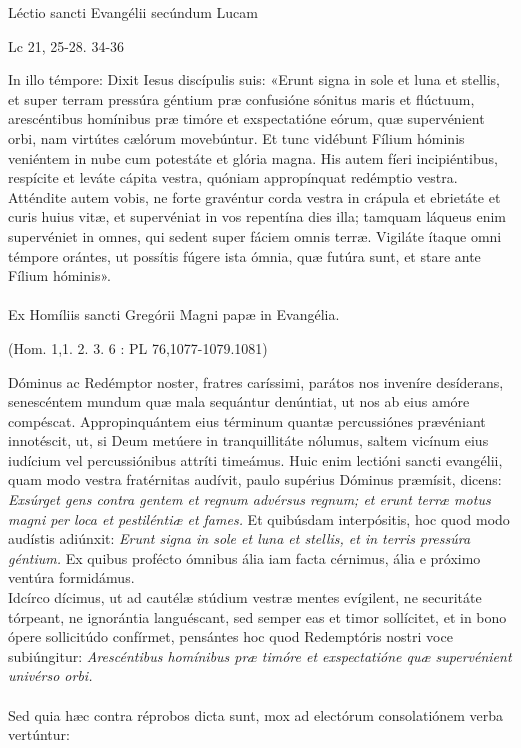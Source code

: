 \documentclass[options]{article}
\begin{document}
Léctio sancti Evangélii secúndum Lucam 
\begin{flushright}
Lc 21, 25-28. 34-36	
\end{flushright}
	In illo témpore: Dixit Iesus discípulis suis:
	«Erunt signa in sole et luna et stellis, et super terram pressúra géntium præ confusióne sónitus maris et flúctuum, arescéntibus homínibus præ timóre et exspectatióne eórum, quæ supervénient orbi, nam virtútes cælórum movebúntur.
	Et tunc vidébunt Fílium hóminis veniéntem in nube cum potestáte et glória magna. His autem fíeri incipiéntibus, respícite et leváte cápita vestra, quóniam appropínquat redémptio vestra.
	Atténdite autem vobis, ne forte gravéntur corda vestra in crápula et ebrietáte et curis huius vitæ, et supervéniat in vos repentína dies illa; tamquam láqueus enim supervéniet in omnes, qui sedent super fáciem omnis terræ. Vigiláte ítaque omni témpore orántes, ut possítis fúgere ista ómnia, quæ futúra sunt, et stare ante Fílium hóminis».\\
	\\
	Ex Homíliis sancti Gregórii Magni papæ in Evangélia.
	\begin{flushright}
			(Hom. 1,1. 2. 3. 6 : PL 76,1077-1079.1081)
	\end{flushright}
	Dóminus ac Redémptor noster, fratres caríssimi, parátos nos inveníre desíderans, senescéntem mundum quæ mala sequántur denúntiat, ut nos ab eius amóre compéscat. Appropinquántem eius términum quantæ percussiónes prævéniant innotéscit, ut, si Deum metúere in tranquillitáte nólumus, saltem vicínum eius iudícium vel percussiónibus attríti timeámus. Huic enim lectióni sancti evangélii, quam modo vestra fratérnitas audívit, paulo supérius Dóminus præmísit, dicens: \emph{Exsúrget gens contra gentem et regnum advérsus regnum; et erunt terræ motus magni per loca et pestiléntiæ et fames.} Et quibúsdam interpósitis, hoc quod modo audístis adiúnxit: \emph{Erunt signa in sole et luna et stellis, et in terris pressúra géntium.} Ex quibus profécto ómnibus ália iam facta cérnimus, ália e próximo ventúra formidámus.\\
	Idcírco dícimus, ut ad cautélæ stúdium vestræ mentes evígilent, ne securitáte tórpeant, ne ignorántia languéscant, sed semper eas et timor sollícitet, et in bono ópere sollicitúdo confírmet, pensántes hoc quod Redemptóris nostri voce subiúngitur: \emph{Arescéntibus homínibus præ timóre et exspectatióne quæ supervénient univérso orbi.}\\
	\\
	Sed quia hæc contra réprobos dicta sunt, mox ad electórum consolatiónem verba vertúntur: 
\end{document}
